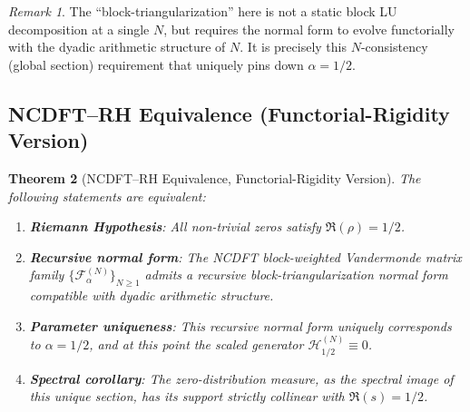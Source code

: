 \documentclass[12pt,a4paper]{amsart}
\theoremstyle{plain}
\newtheorem{theorem}{Theorem}[section]
\theoremstyle{definition}
\theoremstyle{remark}
\newtheorem{remark}[theorem]{Remark}
\begin{document}
\begin{remark}
The ``block-triangularization'' here is not a static block LU decomposition at a single $N$, but requires the normal form to evolve functorially with the dyadic arithmetic structure of $N$. It is precisely this $N$-consistency (global section) requirement that uniquely pins down $\alpha=1/2$.
\end{remark}

\subsection{NCDFT--RH Equivalence (Functorial-Rigidity Version)}

\begin{theorem}[NCDFT--RH Equivalence, Functorial-Rigidity Version]\label{thm:main}
The following statements are equivalent:
\begin{enumerate}
\item \textbf{Riemann Hypothesis}: All non-trivial zeros satisfy $\Re(\rho)=1/2$.
\item \textbf{Recursive normal form}: The NCDFT block-weighted Vandermonde matrix family $\{\mathcal{F}_\alpha^{(N)}\}_{N\geq 1}$ admits a recursive block-triangularization normal form compatible with dyadic arithmetic structure.
\item \textbf{Parameter uniqueness}: This recursive normal form uniquely corresponds to $\alpha=1/2$, and at this point the scaled generator $\mathcal{H}_{1/2}^{(N)}\equiv 0$.
\item \textbf{Spectral corollary}: The zero-distribution measure, as the spectral image of this unique section, has its support strictly collinear with $\Re(s)=1/2$.
\end{enumerate}
\end{theorem}
\end{document}
